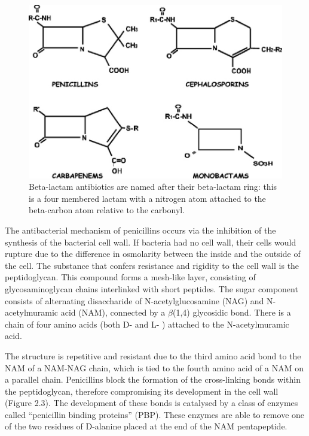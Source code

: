 \documentclass[11pt]{report}
\begin{document}
\clearpage
\begin{figure}[htp]
\centering
\includegraphics[scale=0.35]{immagini gamalero/beta_lacatams.jpg}
\caption{Beta-lactam antibiotics are named after their beta-lactam ring: this is a four membered lactam with a nitrogen atom attached to the beta-carbon atom relative to the carbonyl.}
\label{}
\end{figure}

The antibacterial mechanism of penicillins occurs via the inhibition of the synthesis of the bacterial cell wall.
If bacteria had no cell wall, their cells would rupture due to the difference in osmolarity between the inside and the outside of the cell.
The substance that confers resistance and rigidity to the cell wall is the peptidoglycan.
This compound forms a mesh-like layer, consisting of glycosaminoglycan chains interlinked with short peptides.
The sugar component consists of alternating disaccharide of N-acetylglucosamine (NAG) and N-acetylmuramic acid (NAM), connected by a $\beta$(1,4) glycosidic bond.
There is a chain of four amino acids (both D- and L- ) attached to the N-acetylmuramic acid.

The structure is repetitive and resistant due to the third amino acid bond to the NAM of a NAM-NAG chain, which is tied to the fourth amino acid of a NAM on a parallel chain.
Penicillins block the formation of the cross-linking bonds within the peptidoglycan, therefore compromising its development in the cell wall (Figure 2.3).
The development of these bonds is catalysed by a class of enzymes called “penicillin binding proteins” (PBP).
These enzymes are able to remove one of the two residues of D-alanine placed at the end of the NAM pentapeptide.
\end{document}

